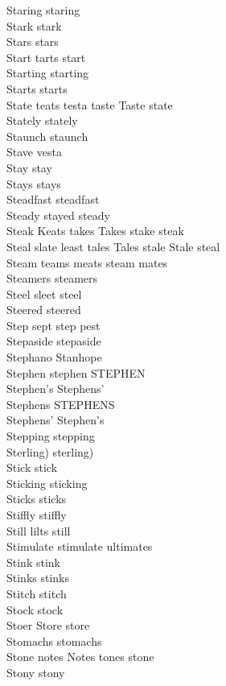 Staring staring\\
Stark stark\\
Stars stars\\
Start tarts start\\
Starting starting\\
Starts starts\\
State teats testa taste Taste state\\
Stately stately\\
Staunch staunch\\
Stave vesta\\
Stay stay\\
Stays stays\\
Steadfast steadfast\\
Steady stayed steady\\
Steak Keats takes Takes stake steak\\
Steal slate least tales Tales stale Stale steal\\
Steam teams meats steam mates\\
Steamers steamers\\
Steel sleet steel\\
Steered steered\\
Step sept step pest\\
Stepaside stepaside\\
Stephano Stanhope\\
Stephen stephen STEPHEN\\
Stephen's Stephens'\\
Stephens STEPHENS\\
Stephens' Stephen's\\
Stepping stepping\\
Sterling) sterling)\\
Stick stick\\
Sticking sticking\\
Sticks sticks\\
Stiffly stiffly\\
Still lilts still\\
Stimulate stimulate ultimates\\
Stink stink\\
Stinks stinks\\
Stitch stitch\\
Stock stock\\
Stoer Store store\\
Stomachs stomachs\\
Stone notes Notes tones stone\\
Stony stony\\
